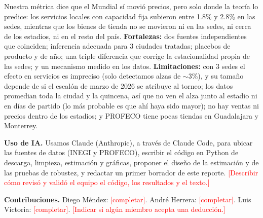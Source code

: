 \documentclass[11pt,letterpaper]{article}
\newcommand{\completar}[1]{\textcolor{red}{[#1]}}
\newcommand{\seccion}[1]{\vspace{4pt}{\large\bfseries #1}\par\vspace{1pt}}
\begin{document}
\seccion{(g) Conclusiones}
Nuestra métrica dice que el Mundial sí movió precios, pero solo donde la teoría lo predice: los
servicios locales con capacidad fija subieron entre 1.8\% y 2.8\% en las sedes, mientras que los
bienes de tienda no se movieron ni en las sedes, ni cerca de los estadios, ni en el resto del país.
\textbf{Fortalezas:} dos fuentes independientes que coinciden; inferencia adecuada para 3 ciudades
tratadas; placebos de producto y de año; una triple diferencia que corrige la estacionalidad
propia de las sedes; y un mecanismo medido en los datos. \textbf{Limitaciones:} con 3 sedes el
efecto en servicios es impreciso (solo detectamos alzas de ${\sim}3\%$), y su tamaño depende de si
el escalón de marzo de 2026 se atribuye al torneo; los datos promedian toda la ciudad y la
quincena, así que no ven el alza junto al estadio ni en días de partido (lo más probable es que
ahí haya sido mayor); no hay ventas ni precios dentro de los estadios; y PROFECO tiene pocas
tiendas en Guadalajara y Monterrey.

\seccion{(h) Uso de IA y contribución de cada miembro}
\textbf{Uso de IA.} Usamos Claude (Anthropic), a través de Claude Code, para ubicar las fuentes de
datos (INEGI y PROFECO), escribir el código en Python de descarga, limpieza, estimación y
gráficas, proponer el diseño de la estimación y de las pruebas de robustez, y redactar un primer
borrador de este reporte. \completar{Describir cómo revisó y validó el equipo el código, los
resultados y el texto.}

\textbf{Contribuciones.} Diego Méndez: \completar{completar}. André Herrera: \completar{completar}.
Luis Victoria: \completar{completar}. \completar{Indicar si algún miembro acepta una deducción.}
\end{document}
